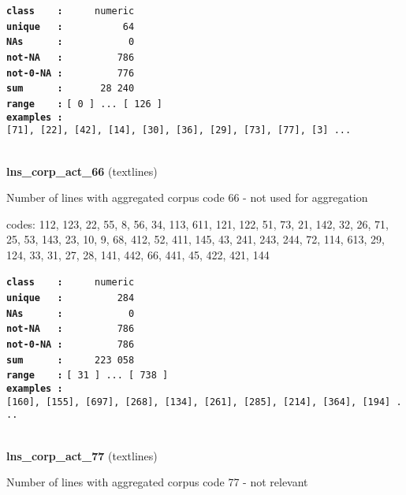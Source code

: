 \documentclass[]{article}
\begin{document}
\textbf{\texttt{class\ \ \ \ :}} \texttt{~~~~~numeric}\\
\textbf{\texttt{unique\ \ \ :}} \texttt{~~~~~~~~~~64}\\
\textbf{\texttt{NAs\ \ \ \ \ \ :}} \texttt{~~~~~~~~~~~0}\\
\textbf{\texttt{not-NA\ \ \ :}} \texttt{~~~~~~~~~786}\\
\textbf{\texttt{not-0-NA\ :}} \texttt{~~~~~~~~~776}\\
\textbf{\texttt{sum\ \ \ \ \ \ :}} \texttt{~~~~~~28~240}\\
\textbf{\texttt{range\ \ \ \ :}}
\texttt{{[}\ 0\ {]}\ ...\ {[}\ 126\ {]}}\\
\textbf{\texttt{examples\ :}}
\texttt{{[}71{]},\ {[}22{]},\ {[}42{]},\ {[}14{]},\ {[}30{]},\ {[}36{]},\ {[}29{]},\ {[}73{]},\ {[}77{]},\ {[}3{]}\ ...}\\

~

\textbf{lns\_corp\_act\_66} (textlines)

Number of lines with aggregated corpus code 66 - not used for
aggregation

codes: 112, 123, 22, 55, 8, 56, 34, 113, 611, 121, 122, 51, 73, 21, 142,
32, 26, 71, 25, 53, 143, 23, 10, 9, 68, 412, 52, 411, 145, 43, 241, 243,
244, 72, 114, 613, 29, 124, 33, 31, 27, 28, 141, 442, 66, 441, 45, 422,
421, 144

\textbf{\texttt{class\ \ \ \ :}} \texttt{~~~~~numeric}\\
\textbf{\texttt{unique\ \ \ :}} \texttt{~~~~~~~~~284}\\
\textbf{\texttt{NAs\ \ \ \ \ \ :}} \texttt{~~~~~~~~~~~0}\\
\textbf{\texttt{not-NA\ \ \ :}} \texttt{~~~~~~~~~786}\\
\textbf{\texttt{not-0-NA\ :}} \texttt{~~~~~~~~~786}\\
\textbf{\texttt{sum\ \ \ \ \ \ :}} \texttt{~~~~~223~058}\\
\textbf{\texttt{range\ \ \ \ :}}
\texttt{{[}\ 31\ {]}\ ...\ {[}\ 738\ {]}}\\
\textbf{\texttt{examples\ :}}
\texttt{{[}160{]},\ {[}155{]},\ {[}697{]},\ {[}268{]},\ {[}134{]},\ {[}261{]},\ {[}285{]},\ {[}214{]},\ {[}364{]},\ {[}194{]}\ ...}\\

~

\textbf{lns\_corp\_act\_77} (textlines)

Number of lines with aggregated corpus code 77 - not relevant
\end{document}
